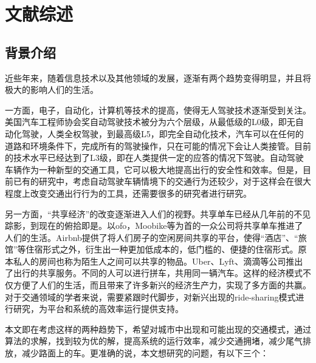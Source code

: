 \chapter{文献综述}
\label{chap:liter}
\section{背景介绍}
近些年来，随着信息技术以及其他领域的发展，逐渐有两个趋势变得明显，并且将极大的影响人们的生活。
\par
一方面，电子，自动化，计算机等技术的提高，使得无人驾驶技术逐渐受到关注。美国汽车工程师协会奖自动驾驶技术被分为六个层级，从最低级的L0级，即无自动化驾驶，人类全权驾驶，到最高级L5，即完全自动化技术，汽车可以在任何的道路和环境条件下，完成所有的驾驶操作，只在可能的情况下会让人类接管。目前的技术水平已经达到了L3级，即在人类提供一定的应答的情况下驾驶。自动驾驶车辆作为一种新型的交通工具，它可以极大地提高出行的安全性和效率\cite{lee2019autonomous}。但是，目前已有的研究中，考虑自动驾驶车辆情境下的交通行为还较少，对于这样会在很大程度上改变交通出行行为的工具，还需要很多的研究者进行研究。
\par
另一方面，“共享经济”的改变逐渐进入人们的视野。共享单车已经从几年前的不见踪影，到现在的俯拾即是。以ofo，Moobike等为首的一众公司将共享单车推进了人们的生活。Airbnb提供了将人们房子的空闲房间共享的平台，使得“酒店”、“旅馆”等住宿形式之外，衍生出一种更加低成本的，低门槛的、便捷的住宿形式。原本私人的房间也称为陌生人之间可以共享的物品。Uber、Lyft、滴滴等公司推出了出行的共享服务。不同的人可以进行拼车，共用同一辆汽车。这样的经济模式不仅方便了人们的生活，而且带来了许多新兴的经济生产力，实现了多方面的共赢。对于交通领域的学者来说，需要紧跟时代脚步，对新兴出现的ride-sharing模式进行研究，为平台和系统的高效率运行提供支持。
\par
本文即在考虑这样的两种趋势下，希望对城市中出现和可能出现的交通模式，通过算法的求解，找到较为优的解，提高系统的运行效率，减少交通拥堵，减少尾气排放，减少路面上的车。更准确的说，本文想研究的问题，有以下三个：
